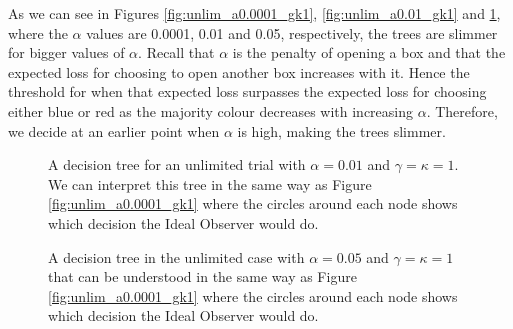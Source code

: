 As we can see in Figures \ref{fig:unlim_a0.0001_gk1}, \ref{fig:unlim_a0.01_gk1} and \ref{fig:unlim_a0.05_gk1}, where the $\alpha$ values are 0.0001, 0.01 and 0.05, respectively, the trees are slimmer for bigger values of $\alpha$. Recall that $\alpha$ is the penalty of opening a box and that the expected loss for choosing to open another box increases with it. Hence the threshold for when that expected loss surpasses the expected loss for choosing either blue or red as the majority colour decreases with increasing $\alpha$. Therefore, we decide at an earlier point when $\alpha$ is high, making the trees slimmer.
\begin{figure}
    \centering
    \begin{minipage}{0.45\textwidth} 
        \centering
        \scalebox{0.5}{}
        \caption[IO solution, unlimited. $\alpha=0.01$,$\gamma=\kappa=1$]{A decision tree for an unlimited trial with $\alpha = 0.01$ and $\gamma=\kappa=1$.
        We can interpret this tree in the same way as Figure \ref{fig:unlim_a0.0001_gk1} where the circles around each node shows which decision the Ideal Observer would do.}
        \label{fig:unlim_a0.01_gk1}
    \end{minipage}\hfill
    \begin{minipage}{0.45\textwidth}
        \centering
        \scalebox{0.5}{}
        \caption[IO solution, unlimited. $\alpha=0.05$,$\gamma=\kappa=1$]{A decision tree in the unlimited case with $\alpha = 0.05$ and $\gamma=\kappa=1$ that can be understood in the same way as Figure \ref{fig:unlim_a0.0001_gk1} where the circles around each node shows which decision the Ideal Observer would do.}
        \label{fig:unlim_a0.05_gk1}
    \end{minipage}
\end{figure}



